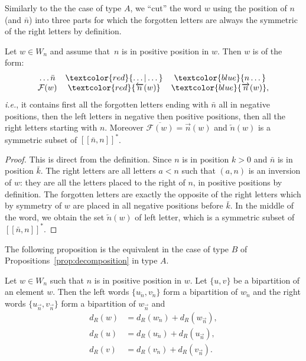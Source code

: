 \documentclass[Unicode]{cedram-alco}
\theoremstyle{definition}
\newcommand{\R}{{\overrightarrow{n}}}
\newcommand{\LL}{{\overleftarrow{n}}}
\newcommand{\dd}{d_R}
\newcommand{\Bsetnn}{[\![\bar{n},n ]\!]^*}
\newcommand{\F}{\mathcal{F}}
\newcommand{\red}[1]{\textcolor{red}{#1}}
\newcommand{\blue}[1]{\textcolor{blue}{#1}}
\begin{document}
Similarly to the the case of type $A$, we ``cut'' the word $w$ using the position of $n$ (and $\bar{n}$) into three parts for which the forgotten letters are always the symmetric of the right letters by definition.

\begin{lemm}
\label{lem:b-cut}
Let $w\in W_n$ and assume that~$n$ is in positive position in $w$. Then $w$ is of the form:
\begin{equation*}
\begin{array}{ccc}
\dots \bar{n}   & \red{\dots | \dots} & \blue{n \dots} \\
\F(w)           & \red{\LL(w)}         & \blue{\R(w)},
\end{array}
\end{equation*}
\emph{i.e.}, it contains first all the forgotten letters ending with $\bar{n}$ all in negative positions, then the left letters in negative then positive positions, then all the right letters starting with $n$. Moreover $\overline{\F(w)}=\R(w)$ and $\LL(w)$ is a symmetric subset of $\Bsetnn$.
\end{lemm}

\begin{proof}
This is direct from the definition. Since $n$ is in position $k > 0$ and $\bar{n}$ is in position $\bar k$. The right letters are all letters $a < n$ such that $(a,n)$ is an inversion of $w$: they are all the letters placed to the right of $n$, in positive positions by definition. The forgotten letters are exactly the opposite of the right letters which by symmetry of $w$ are placed in all negative positions before $\bar k$. In the middle of the word, we obtain the set $\LL(w)$ of left letter, which is a symmetric subset of $\Bsetnn$.
\end{proof}

The following proposition is the equivalent in the case of type $B$ of Propositions~\ref{prop:decomposition} in type $A$.

\begin{prop}
\label{prop:B-decomposition}
Let $w\in W_n$ such that $n$ is in positive position in $w$. Let $\lbrace u, v \rbrace$ be a bipartition of an element $w$. Then the left words $\lbrace u_\LL, v_\LL \rbrace$ form a bipartition of $w_\LL$ and the right words $\lbrace u_\R, v_\R \rbrace$ form a bipartition of $w_\R$ and
\begin{align}
\label{eq:B-deswdecomp}
\dd(w) &= \dd(w_\LL) + \dd(w_\R), \\
\label{eq:B-desudecomp}
\dd(u) &= \dd(u_\LL) + \dd(u_\R), \\
\label{eq:B-desvdecomp}
\dd(v) &= \dd(v_\LL) + \dd(v_\R).
\end{align}
\end{prop}
\end{document}

